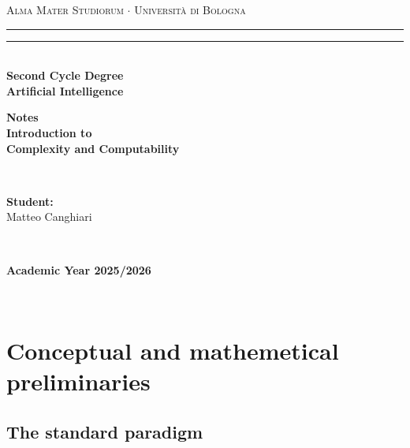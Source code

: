 \documentclass[12pt,a4paper,oneside]{book}
\begin{document}
\pagestyle{empty}
\begin{titlepage}
\begin{center}
    {{\Large{\textsc{Alma Mater Studiorum $\cdot$ Università di Bologna}}}}
    \rule[0.1cm]{\textwidth}{0.1mm}
    \rule[0.5cm]{\textwidth}{0.6mm}\\
    {\small{\bf Second Cycle Degree\\
    Artificial Intelligence}}
\end{center}

\vspace{45mm}

\begin{center}
    \textbf{Notes \\ Introduction to \\ Complexity and Computability}
\end{center}

\vspace{60mm}
\par
\noindent
\begin{minipage}[t]{0.04\textwidth}
~
\end{minipage}
\begin{minipage}[t]{0.4\textwidth}
{{\textbf{Student:}\\
Matteo Canghiari}}
\end{minipage}
\begin{minipage}[t]{0.04\textwidth}
~
\end{minipage}

\vspace{30mm}

\begin{center}
    {\large{\bf Academic Year 2025/2026}}
\end{center}
\end{titlepage}

\restoregeometry

\pagestyle{empty}
\newpage~\newpage
\thispagestyle{empty}

\clearpage
{}
\pagestyle{plain}

\chapter{Conceptual and mathemetical preliminaries}

\label{c_1}

\section{The standard paradigm}

\label{s_1_1}
\end{document}
